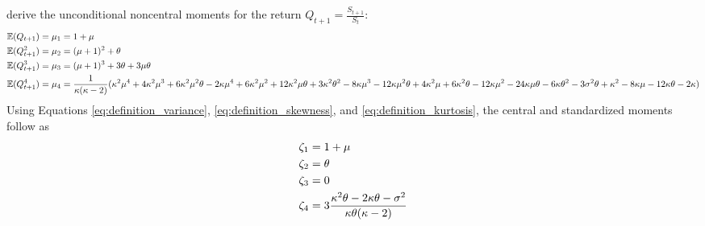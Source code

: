 \cite{dunnEstimatingOptionPrices2014} derive the unconditional noncentral moments for the return $Q_{t+1}=\frac{S_{t+1}}{S_t}$:
\begin{align}
    \mathbb{E}(Q_{t+1}) &= \mu_1 = 1+\mu  \notag \\
    \mathbb{E}(Q_{t+1}^2) &= \mu_2 = (\mu +1)^2+\theta \notag \\
    \mathbb{E}(Q_{t+1}^3) &= \mu_3 = (\mu +1)^3+3\theta+3\mu\theta \notag \\
    \mathbb{E}(Q_{t+1}^4) &= \mu_4 = \frac{1}{\kappa (\kappa -2)}(\kappa^2\mu^4 + 4\kappa^2\mu^3 + 6\kappa^2\mu^2\theta - 2\kappa\mu^4 + 6\kappa^2\mu^2 + 12\kappa^2\mu\theta + 3\kappa^2\theta^2 - 8\kappa\mu^3 - 12\kappa\mu^2\theta + 4\kappa^2\mu + 6\kappa^2\theta - 12\kappa\mu^2 - 24\kappa\mu\theta - 6\kappa\theta^2 - 3\sigma^2\theta + \kappa^2 - 8\kappa\mu - 12\kappa\theta - 2\kappa) \notag
\end{align}
Using Equations \eqref{eq:definition_variance}, \eqref{eq:definition_skewness}, and \eqref{eq:definition_kurtosis}, the central and standardized moments follow as
\begin{align}
    \zeta_1 &= 1+\mu \notag \\
    \zeta_2 &= \theta \notag \\
    \zeta_3 &= 0 \notag \\
    \zeta_4 &= 3\frac{\kappa^2\theta - 2\kappa\theta - \sigma^2}{\kappa\theta(\kappa-2)} \notag
\end{align}